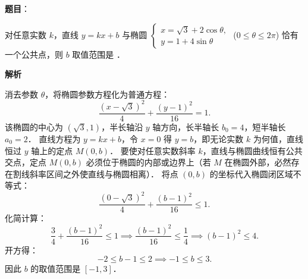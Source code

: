 \begin{answer}

\textbf{题目}：

对任意实数 $k$，直线 $y = kx + b$ 与椭圆 $\begin{cases} x = \sqrt{3} + 2\cos\theta, \\ y = 1 + 4\sin\theta \end{cases}$ ($0 \leqslant \theta \leqslant 2\pi$) 恰有一个公共点，则 $b$ 取值范围是 \gkblank{}．

\textbf{解析}

消去参数 $\theta$，将椭圆参数方程化为普通方程：
\nopagebreak[4]
\[
\frac{(x - \sqrt{3})^2}{4} + \frac{(y - 1)^2}{16} = 1.
\]
该椭圆的中心为 $(\sqrt{3}, 1)$，半长轴沿 $y$ 轴方向，长半轴长 $b_0 = 4$，短半轴长 $a_0 = 2$．
直线方程为 $y = kx + b$，令 $x = 0$ 得 $y = b$，即无论实数 $k$ 为何值，直线恒过 $y$ 轴上的定点 $M(0, b)$．
要使对任意实数斜率 $k$，直线与椭圆曲线恒有公共交点，定点 $M(0, b)$ 必须位于椭圆的内部或边界上（若 $M$ 在椭圆外部，必然存在割线斜率区间之外使直线与椭圆相离）．
将点 $(0, b)$ 的坐标代入椭圆闭区域不等式：
\nopagebreak[4]
\[
\frac{(0 - \sqrt{3})^2}{4} + \frac{(b - 1)^2}{16} \leqslant 1.
\]
化简计算：
\nopagebreak[4]
\[
\frac{3}{4} + \frac{(b - 1)^2}{16} \leqslant 1 \implies \frac{(b - 1)^2}{16} \leqslant \frac{1}{4} \implies (b - 1)^2 \leqslant 4.
\]
开方得：
\nopagebreak[4]
\[
-2 \leqslant b - 1 \leqslant 2 \implies -1 \leqslant b \leqslant 3.
\]
因此 $b$ 的取值范围是 $[-1, 3]$．


\end{answer}
